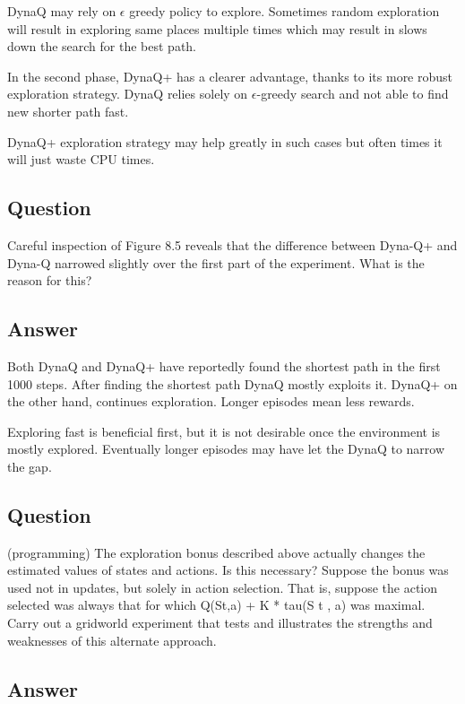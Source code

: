 \documentclass[11pt]{article}
\begin{document}
    DynaQ may rely on $\epsilon$ greedy policy to explore.
    Sometimes random exploration will result in exploring same places multiple times which may result in slows down the search for the best path.

    In the second phase, DynaQ+ has a clearer advantage, thanks to its more robust exploration strategy.
    DynaQ relies solely on $\epsilon$-greedy search and not able to find new shorter path fast.

    DynaQ+ exploration strategy may help greatly in such cases but often times it will just waste CPU times.

    \subsection{Question}

    Careful inspection of Figure 8.5 reveals that the difference between Dyna-Q+ and Dyna-Q narrowed slightly over the first part of the experiment.
    What is the reason for this?

    \subsection*{Answer}

    Both DynaQ and DynaQ+ have reportedly found the shortest path in the first 1000 steps.
    After finding the shortest path DynaQ mostly exploits it.
    DynaQ+ on the other hand, continues exploration.
    Longer episodes mean less rewards.

    Exploring fast is beneficial first, but it is not desirable once the environment is mostly explored.
    Eventually longer episodes may have let the DynaQ to narrow the gap.


    \subsection{Question}

    (programming) The exploration bonus described above actually changes the estimated values of states and actions.
    Is this necessary?
    Suppose the bonus was used not in updates, but solely in action selection.
    That is, suppose the action  selected was always that for which Q(St,a) + K * tau(S t , a) was maximal.
    Carry out a gridworld experiment that tests and illustrates the strengths and weaknesses of this alternate approach.

    \subsection*{Answer}
\end{document}
